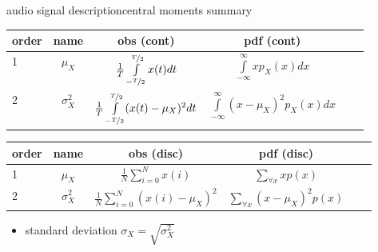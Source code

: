 \begin{frame}{audio signal description}{central moments summary}
    \begin{footnotesize}
     \begin{table}
         \centering
             \begin{tabular}{lccccc}
                 order & name & obs (cont) & pdf (cont) & \\\hline
                1 & $\mu_X$ & $\frac{1}{T}\int\limits_{-\nicefrac{T}{2}}^{\nicefrac{T}{2}} x(t)dt$ & $\int\limits_{-\infty}^{\infty}{xp_X(x)dx}$  \\
                2 & $\sigma_X^2$ & $\frac{1}{T}\int\limits_{-\nicefrac{T}{2}}^{\nicefrac{T}{2}}(x(t)-\mu_X)^2dt$ & $\int\limits_{-\infty}^{\infty} (x-\mu_X)^2p_X(x)dx$  \\
             \end{tabular}
     \end{table}
     \begin{table}
         \centering
             \begin{tabular}{lccccc}
                 order & name  & obs (disc) & pdf (disc)\\\hline
                1 & $\mu_X$         &  $\frac{1}{N}\sum\limits_{i=0}^{N} x(i)$              & $\sum\limits_{\forall x} x p(x)$ \\
                2 & $\sigma_X^2$    &  $\frac{1}{N}\sum\limits_{i=0}^{N} (x(i)-\mu_X)^2$    & $\sum\limits_{\forall x} (x-\mu_X)^2p(x)$ \\
             \end{tabular}
     \end{table}
    \end{footnotesize}
    \begin{itemize}
        \item[] standard deviation $\sigma_X = \sqrt{\sigma_X^2}$
    \end{itemize}
\end{frame}		

